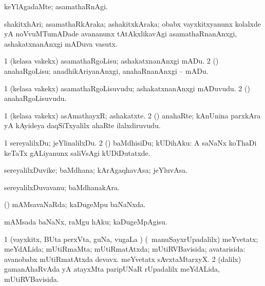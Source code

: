 \bentry
{}
\gl{\kirxvi}
\bmng
keYlAgadaMte; asamathaRnAgi. 
\emng
\eentry

\bentry
{}
\gl{\nA}
\bmng
shakitxhAri; asamathaRkAraka; ashakitxkAraka; obabx vayxkitxyanunx kolalxde yA noVvuMTumADade avananunx tAtAkxlikavAgi asamathaRnanAnxgi, ashakatxnanAnxgi mADuva vasutx. 
\emng
\eentry

\bentry
{}
\gl{\sakirx}
\bmng
\bnum
\num{1} (kelasa \mo vakekx) asamathaRgoLisu; ashakatxnanAnxgi mADu. 
\num{2} (\nAyxshA) anahaRgoLisu; anadhikAriyanAnxgi, anahaRnanAnxgi -- mADu. 
\enum
\emng
\eentry

\bentry
{}
\gl{\nA}
\bmng
\bnum
\num{1} (kelasa \mo vakekx) asamathaRgoLisuvudu; ashakatxnanAnxgi mADuvudu. 
\num{2} (\nAyxshA) anahaRgoLisuvudu. 
\enum
\emng
\eentry

\bentry
{}
\gl{\nA}
\bmng
\bnum
\num{1} (kelasa \mo vakekx) asAmathayxR; ashakatxte. 
\num{2} (\nAyxshA) anahaRte; kAnUnina parxkAra yA kAyideya daqSiTxyalilx ahaRte ilalxdiruvudu. 
\enum
\emng
\eentry

\bentry
{}
\gl{\sakirx}
\bmng
\bnum
\num{1} sereyalilxDu; jeYlinalilxDu. 
\num{2} (\rUpa) baMdhisiDu; kUDihAku:  A saNaNx koThaDi keTaTx gALiyanunx saliVsAgi kUDiDutatxde. 
\enum
\emng
\eentry

\bentry
{}
\gl{\nA}
\bmng
sereyalilxDuvike; baMdhana; kArAgaqhavAsa; jeYluvAsa. 
\emng
\eentry

\bentry
{}
\gl{\nA}
\bmng
sereyalilxDuvavanu; baMdhanakAra. 
\emng
\eentry

\bentry
{}
\gl{\gu}
\bmng
(\kAparx) mAMsavaNaRda; kaDugeMpu baNaNxda. 
\emng
\eentry

\bentry
{}
\gl{\sakirx}
\bmng
mAMsada baNaNx, raMgu hAku; kaDugeMpAgisu. 
\emng
\eentry

\bentry
{}
\gl{\gu}
\bmng
\bnum
\num{1} (vayxkitx, BUta perxVta, guNa, \mo vugaLa \vi) (\kanmu\ manuSayxrUpadalilx) meYvetatx; meYdALida; mUtiRmaMta; mUtiRmatAtxda; mUtiRVBavisida; avatarisida:  avanobabx mUtiRmatAtxda devavx.  meYvetatx sAvxtaMtarxyX. 
\num{2} (\BUkaq dalilx) gamanAhaRvAda yA atayxMta paripUNaR rUpadalilx meYdALida, mUtiRVBavisida. 
\enum
\emng
\eentry

